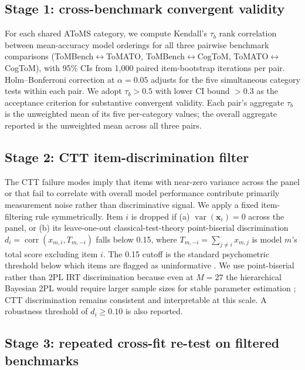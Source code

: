 \documentclass{article} %
\begin{document}
\subsection{Stage 1: cross-benchmark convergent validity}
\label{sec:methods-stage1}
 
For each shared AToMS category, we compute Kendall's $\tau_b$ rank correlation between mean-accuracy model orderings for all three pairwise benchmark comparisons (ToMBench$\leftrightarrow$ToMATO, ToMBench$\leftrightarrow$CogToM, ToMATO$\leftrightarrow$CogToM), with 95\% CIs from 1{,}000 paired item-bootstrap iterations per pair. Holm--Bonferroni correction at $\alpha=0.05$ adjusts for the five simultaneous category tests within each pair. We adopt $\tau_b > 0.5$ with lower CI bound $> 0.3$ as the acceptance criterion for substantive convergent validity. Each pair's aggregate $\tau_b$ is the unweighted mean of its five per-category values; the overall aggregate reported is the unweighted mean across all three pairs.
 
\subsection{Stage 2: CTT item-discrimination filter}
\label{sec:methods-stage2}
 
The CTT failure modes imply that items with near-zero variance across the panel or that fail to correlate with overall model performance contribute primarily measurement noise rather than discriminative signal. We apply a fixed item-filtering rule symmetrically. Item $i$ is dropped if (a) $\operatorname{var}(\mathbf{x}_i)=0$ across the panel, or (b) its leave-one-out classical-test-theory point-biserial discrimination $d_i = \operatorname{corr}(x_{m,i},T_{m,-i})$ falls below 0.15, where $T_{m,-i}=\sum_{j\neq i}x_{m,j}$ is model $m$'s total score excluding item $i$. The 0.15 cutoff is the standard psychometric threshold below which items are flagged as uninformative \citep{furr2014psychometrics,edelen2007applying}. We use point-biserial rather than 2PL IRT discrimination because even at $M=27$ the hierarchical Bayesian 2PL would require larger sample sizes for stable parameter estimation \citep{konig2020optimized,fujimoto2020bayesian}; CTT discrimination remains consistent and interpretable at this scale. A robustness threshold of $d_i\ge 0.10$ is also reported.
 
\subsection{Stage 3: repeated cross-fit re-test on filtered benchmarks}
\label{sec:methods-stage3}
 
\end{document}
